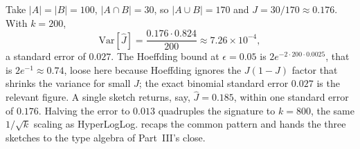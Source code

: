 Take $|A| = |B| = 100$, $|A \cap B| = 30$, so $|A \cup B| = 170$ and $J = 30/170
\approx 0.176$. With $k = 200$,
\[
  \mathrm{Var}[\hat J] = \frac{0.176 \cdot 0.824}{200} \approx 7.26 \times
  10^{-4},
\]
a standard error of $0.027$. The Hoeffding bound at $\epsilon = 0.05$ is
$2e^{-2 \cdot 200 \cdot 0.0025}$, that is $2e^{-1} \approx 0.74$, loose here because
Hoeffding ignores the $J(1-J)$ factor that shrinks the variance for small $J$;
the exact binomial standard error $0.027$ is the relevant figure. A single
sketch returns, say, $\hat J = 0.185$, within one standard error of $0.176$.
Halving the error to $0.013$ quadruples the signature to $k = 800$, the same
$1/\sqrt{k}$ scaling as HyperLogLog.  recaps the common
pattern and hands the three sketches to the type algebra of Part~III's close.
